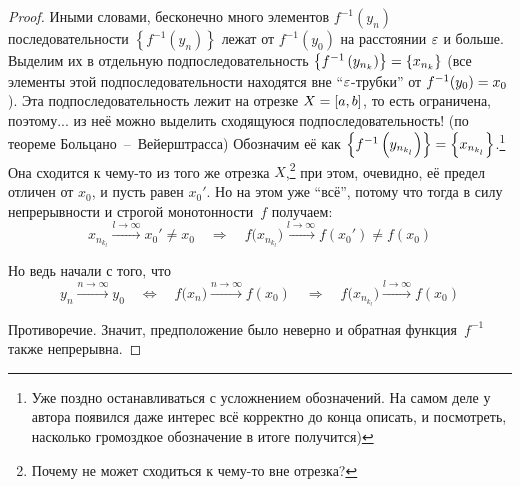 \documentclass[a4paper,12pt]{article}
\begin{document}
\begin{proof}
    Иными словами, бесконечно много элементов $f^{-1}(y_n)$ последовательности $\left\{f^{-1}(y_n)\right\}$ лежат от $f^{-1}(y_0)$ на расстоянии $\varepsilon$ и больше.
    Выделим их в отдельную подпоследовательность $\left\{f^{-1}\left(y_{n_k}\right)\right\} \hm= \left\{x_{n_k}\right\}$ (все элементы этой подпоследовательности находятся вне ``$\varepsilon$-трубки'' от $f^{-1}(y_0) \hm= x_0$).
    Эта подпоследовательность лежит на отрезке $X \hm= [a, b]$, то есть ограничена, поэтому... из неё можно выделить сходящуюся подпоследовательность! (по теореме Больцано~--~Вейерштрасса)
    Обозначим её как $\left\{f^{-1}\left(y_{n_{k_l}}\right)\right\} \hm= \left\{x_{n_{k_l}}\right\}$.\footnote{
      Уже поздно останавливаться с усложнением обозначений.
      На самом деле у автора появился даже интерес всё корректно до конца описать, и посмотреть, насколько громоздкое обозначение в итоге получится)
    }
    Она сходится к чему-то из того же отрезка $X$,\footnote{
      Почему не может сходиться к чему-то вне отрезка?
    }
    при этом, очевидно, её предел отличен от $x_0$, и пусть равен $x_0'$.
    Но на этом уже ``всё'', потому что тогда в силу непрерывности и строгой монотонности~$f$ получаем:
    \[
      x_{n_{k_l}} \xrightarrow{l \to \infty} x_0' \not= x_0
        \quad\Rightarrow\quad f\bigl(x_{n_{k_l}}\bigr) \xrightarrow{l \to \infty} f(x_0') \not= f(x_0)
    \]
    
    Но ведь начали с того, что
    \[
      y_n \xrightarrow{n \to\infty} y_0
        \quad\Leftrightarrow\quad f\bigl(x_{n}\bigr) \xrightarrow{n \to \infty} f(x_0)
        \quad\Rightarrow\quad f\bigl(x_{n_{k_l}}\bigr) \xrightarrow{l \to \infty} f(x_0)
    \]
    
    Противоречие.
    Значит, предположение было неверно и обратная функция~$f^{-1}$ также непрерывна.
  \end{proof}

  
\end{document}
